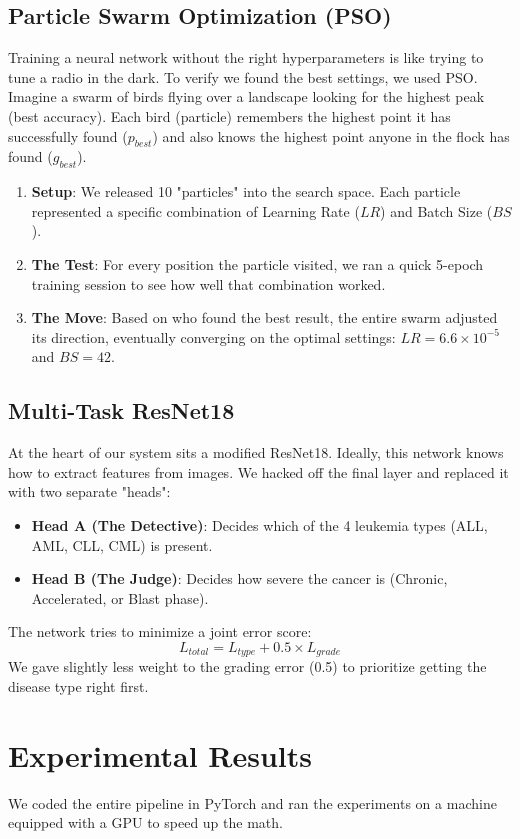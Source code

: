 \documentclass[conference]{IEEEtran}
\begin{document}
\subsection{Particle Swarm Optimization (PSO)}
Training a neural network without the right hyperparameters is like trying to tune a radio in the dark. To verify we found the best settings, we used PSO. Imagine a swarm of birds flying over a landscape looking for the highest peak (best accuracy). Each bird (particle) remembers the highest point it has successfully found ($p_{best}$) and also knows the highest point anyone in the flock has found ($g_{best}$).
\begin{enumerate}
    \item \textbf{Setup}: We released 10 "particles" into the search space. Each particle represented a specific combination of Learning Rate ($LR$) and Batch Size ($BS$).
    \item \textbf{The Test}: For every position the particle visited, we ran a quick 5-epoch training session to see how well that combination worked.
    \item \textbf{The Move}: Based on who found the best result, the entire swarm adjusted its direction, eventually converging on the optimal settings: $LR=6.6 \times 10^{-5}$ and $BS=42$.
\end{enumerate}

\subsection{Multi-Task ResNet18}
At the heart of our system sits a modified ResNet18. Ideally, this network knows how to extract features from images. We hacked off the final layer and replaced it with two separate "heads":
\begin{itemize}
    \item \textbf{Head A (The Detective)}: Decides which of the 4 leukemia types (ALL, AML, CLL, CML) is present.
    \item \textbf{Head B (The Judge)}: Decides how severe the cancer is (Chronic, Accelerated, or Blast phase).
\end{itemize}
The network tries to minimize a joint error score:
\begin{equation}
L_{total} = L_{type} + 0.5 \times L_{grade}
\end{equation}
We gave slightly less weight to the grading error (0.5) to prioritize getting the disease type right first.

\section{Experimental Results}
We coded the entire pipeline in PyTorch and ran the experiments on a machine equipped with a GPU to speed up the math.
\end{document}
